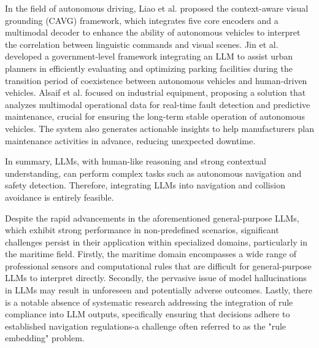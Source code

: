 In the field of autonomous driving, Liao et al. \cite{LIAO2024100116} proposed the context-aware visual grounding (CAVG) framework, which integrates five core encoders and a multimodal decoder to enhance the ability of autonomous vehicles to interpret the correlation between linguistic commands and visual scenes. Jin et al. \cite{JIN2024105940} developed a government-level framework integrating an LLM to assist urban planners in efficiently evaluating and optimizing parking facilities during the transition period of coexistence between autonomous vehicles and human-driven vehicles.  Alsaif et al. \cite{electronics13244912} focused on industrial equipment, proposing a solution that analyzes multimodal operational data for real-time fault detection and predictive maintenance, crucial for ensuring the long-term stable operation of autonomous vehicles. The system also generates actionable insights to help manufacturers plan maintenance activities in advance, reducing unexpected downtime. 

In summary, LLMs, with human-like reasoning and strong contextual understanding, can perform complex tasks such as autonomous navigation and safety detection. Therefore, integrating LLMs into navigation and collision avoidance is entirely feasible. 

Despite the rapid advancements in the aforementioned general-purpose LLMs, which exhibit strong performance in non-predefined scenarios, significant challenges persist in their application within specialized domains, particularly in the maritime field. Firstly, the maritime domain encompasses a wide range of professional sensors and computational rules that are difficult for general-purpose LLMs to interpret directly. Secondly, the pervasive issue of model hallucinations in LLMs may result in unforeseen and potentially adverse outcomes. Lastly, there is a notable absence of systematic research addressing the integration of rule compliance into LLM outputs, specifically ensuring that decisions adhere to established navigation regulations-a challenge often referred to as the "rule embedding" problem.